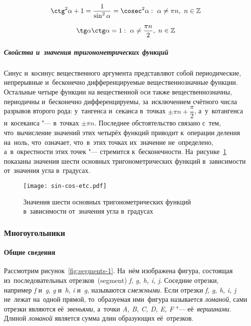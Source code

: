 \documentclass[]{scrartcl}
\begin{document}
\begin{equation}\label{eq:trigon-identity-3}
\ctg^2 \alpha + 1 = \frac{1}{\sin^2 \alpha} = \cosec^2 \alpha:\ \alpha \neq \pi n,\ n \in \mathbb{Z}
\end{equation}

\begin{equation}\label{eq:trigon-identity-4}
\tg \alpha \ctg \alpha = 1:\ \alpha \neq \frac{\pi n}{2},\ n \in \mathbb{Z}
\end{equation}

\subparagraph{Свойства и~значения тригонометрических функций}
Синус и~косинус вещественного аргумента представляют собой периодические, непрерывные и~бесконечно дифференцируемые вещественнозначные функции. Остальные четыре функции на вещественной оси также вещественнозначны, периодичны и~бесконечно дифференцируемы, за~исключением счётного числа разрывов второго рода: у~тангенса и~секанса в~точках  $\textstyle \pm \pi n+ \dfrac{\pi}{2}$, а~у~котангенса и~косеканса "--- в~точках $\textstyle \pm \pi n$. Последнее обстоятельство связано с~тем, что~вычисление значений этих четырёх функций приводит к~операции деления на~ноль, что~означает, что~в~этих точках их~значение не~определено, а~в~окрестности этих точек "--- стремится к~бесконечности. На~рисунке~\ref{fig:sin-cos-etc} показаны значения шести основных тригонометрических функций в~зависимости от~значения угла в~градусах.

\begin{figure}[ht]
	\centering %
	\texttt{[image: sin-cos-etc.pdf]}
	\caption{Значения шести основных тригонометрических функций в~зависимости от~значения угла в~градусах}\label{fig:sin-cos-etc}
\end{figure}

\subsubsection{Многоугольники}

\paragraph{Общие сведения}

Рассмотрим рисунок~\ref{fig:segments-1}. На~нём изображена фигура, состоящая из~последовательных отрезков~(\foreignlanguage{english}{segment}) \textit{f, g, h, i, j}. Соседние отрезки, например \textit{f} и~\textit{g}, \textit{g} и~\textit{h}, \textit{i} и~\textit{g}, называются \emph{смежными}. Если отрезки \textit{f, g, h, i, j} не~лежат на~одной прямой, то~образуемая ими~фигура называется \emph{ломаной}, сами отрезки являются её~\emph{звеньями}, а~точки \textit{A, B, C, D, E, F} "--- её~\emph{вершинами}. Длиной \emph{ломаной} является сумма длин образующих её~отрезков.
\end{document}
